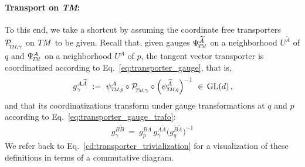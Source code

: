 \paragraph{Transport on \textit{TM}:}
To this end, we take a shortcut by assuming the coordinate free transporters $\PTMgamma$ on $T\mkern-1.5muM$ to be given.
Recall that, given gauges $\PsiTM^{\widetilde{A}}$ on a neighborhood $U^{\widetilde{A}}$ of $q$ and $\PsiTM^A$ on a neighborhood $U^A$ of $p$, the tangent vector transporter is coordinatized according to Eq.~\eqref{eq:transporter_gauge}, that is,
\begin{align}\label{eq:transporter_gauge_copy}
    g_\gamma^{A\widetilde{A}} \ :=\ \psiTMp^A \circ \PTMgamma \circ \Big( \psiTMq^{\widetilde{A}} \Big)^{-1} \ \in\, \GL{d} \,,
\end{align}
and that its coordinatizations transform under gauge transformations at $q$ and $p$ according to Eq.~\eqref{eq:transporter_gauge_trafo}:
\begin{align}\label{eq:transporter_gauge_trafo_copy}
    g_\gamma^{B\widetilde{B}} \ =\ g_p^{BA}\, g_\gamma^{A\widetilde{A}} \Big(g_q^{\widetilde{B}\widetilde{A}}\Big)^{-1}
\end{align}
We refer back to Eq.~\eqref{cd:transporter_trivialization} for a visualization of these definitions in terms of a commutative diagram.








